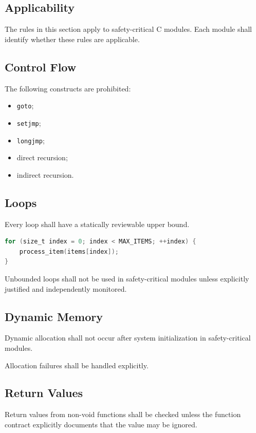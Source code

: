 \subsection{Applicability}

The rules in this section apply to safety-critical C modules. Each module
shall identify whether these rules are applicable.

\subsection{Control Flow}

The following constructs are prohibited:

\begin{itemize}
    \item \texttt{goto};
    \item \texttt{setjmp};
    \item \texttt{longjmp};
    \item direct recursion;
    \item indirect recursion.
\end{itemize}

\subsection{Loops}

Every loop shall have a statically reviewable upper bound.

\begin{lstlisting}[language=C]
for (size_t index = 0; index < MAX_ITEMS; ++index) {
    process_item(items[index]);
}
\end{lstlisting}

Unbounded loops shall not be used in safety-critical modules unless
explicitly justified and independently monitored.

\subsection{Dynamic Memory}

Dynamic allocation shall not occur after system initialization in
safety-critical modules.

Allocation failures shall be handled explicitly.

\subsection{Return Values}

Return values from non-void functions shall be checked unless the function
contract explicitly documents that the value may be ignored.
